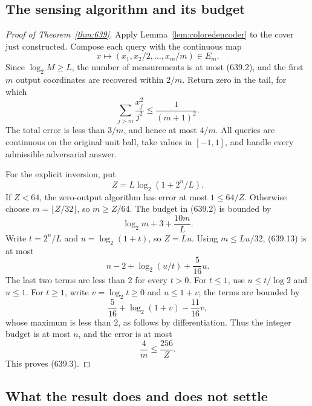 \documentclass[11pt,a4paper]{article}
\theoremstyle{definition}
\theoremstyle{remark}
\numberwithin{equation}{section}
\begin{document}
\subsection{The sensing algorithm and its budget}

\begin{proof}[Proof of Theorem~\ref{thm:639}]
Apply Lemma~\ref{lem:coloredencoder} to the cover just constructed.
Compose each query with the continuous map
\[
               x\longmapsto (x_1,x_2/2,\ldots,x_m/m)\in E_m .
 \tag{639.10}
\]
Since \(\log_2M\ge L\), the number of measurements is at most
(639.2), and the first \(m\) output coordinates are recovered within
\(2/m\). Return zero in the tail, for which
\[
                    \sum_{j>m}\frac{x_j^2}{j^2}
                            \le\frac1{(m+1)^2}.
 \tag{639.11}
\]
The total error is less than \(3/m\), and hence at most \(4/m\).
All queries are continuous on the original unit ball, take values in
\([-1,1]\), and handle every admissible adversarial answer.

For the explicit inversion, put
\[
                         Z=L\log_2(1+2^n/L).
 \tag{639.12}
\]
If \(Z<64\), the zero-output algorithm has error at most
\(1\le64/Z\). Otherwise choose \(m=\lfloor Z/32\rfloor\), so
\(m\ge Z/64\). The budget in (639.2) is bounded by
\[
                         \log_2m+3+\frac{10m}{L}.
 \tag{639.13}
\]
Write \(t=2^n/L\) and \(u=\log_2(1+t)\), so \(Z=Lu\).
Using \(m\le Lu/32\), (639.13) is at most
\[
                   n-2+\log_2(u/t)+\frac5{16}u .
 \tag{639.14}
\]
The last two terms are less than \(2\) for every \(t>0\).
For \(t\le1\), use \(u\le t/\log2\) and \(u\le1\).
For \(t\ge1\), write \(v=\log_2t\ge0\) and \(u\le1+v\);
the terms are bounded by
\[
                    \frac5{16}+\log_2(1+v)-\frac{11}{16}v,
 \tag{639.15}
\]
whose maximum is less than \(2\), as follows by differentiation.
Thus the integer budget is at most \(n\), and the error is at most
\[
                             \frac4m\le\frac{256}{Z}.
 \tag{639.16}
\]
This proves (639.3).
\end{proof}

\subsection{What the result does and does not settle}
\end{document}
